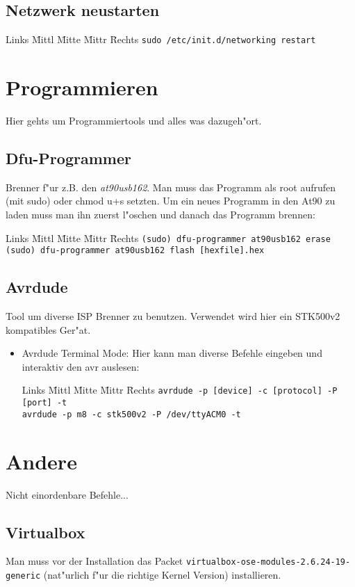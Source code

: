 \documentclass[12pt]{article}
\newenvironment{code}{\begin{tabbing}Links \= Mittl \= Mitte \= Mittr \= Rechts \kill}{\end{tabbing}}
\begin{document}
\subsection{Netzwerk neustarten}
\begin{code}
	\> \verb#sudo /etc/init.d/networking restart#
\end{code}

\section{Programmieren}
Hier gehts um Programmiertools und alles was dazugeh"ort.
\subsection{Dfu-Programmer}
Brenner f"ur z.B. den \textit{at90usb162}. Man muss das Programm als root aufrufen (mit sudo) oder
chmod u+s setzten.
Um ein neues Programm in den At90 zu laden muss man ihn zuerst l"oschen und danach das Programm brennen:
\begin{code}
	\> \verb#(sudo) dfu-programmer at90usb162 erase# \\
	\> \verb#(sudo) dfu-programmer at90usb162 flash [hexfile].hex#	
\end{code}
\subsection{Avrdude}
Tool um diverse ISP Brenner zu benutzen. Verwendet wird hier ein STK500v2 kompatibles Ger"at.
\begin{itemize}
	\item Avrdude Terminal Mode: Hier kann man diverse Befehle eingeben und interaktiv den avr auslesen:
	\begin{code}
		\> \verb#avrdude -p [device] -c [protocol] -P [port] -t# \\
		\> \verb#avrdude -p m8 -c stk500v2 -P /dev/ttyACM0 -t#
	\end{code}
\end{itemize}

\section{Andere}
Nicht einordenbare Befehle...
\subsection{Virtualbox}
Man muss vor der Installation das Packet \verb#virtualbox-ose-modules-2.6.24-19-generic# (nat"urlich 
f"ur die richtige Kernel Version) installieren.
\end{document}
